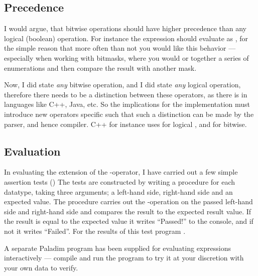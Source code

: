 \subsection{Precedence}
I would argue, that bitwise operations should have higher precedence than any
logical (boolean) operation. For instance the expression  should evaluate as , for the simple reason
that more often than not you would like this behavior --- especially when
working with bitmasks, where you would  or  together a
series of enumerations and then compare the result with another mask.

Now, I did state {\it any} bitwise operation, and I did state {\it any}
logical operation, therefore there needs to be a distinction between these
operators, as there is in languages like C++, Java, etc. So the implications
for the implementation must introduce new operators specific such that such a
distinction can be made by the parser, and hence compiler. C++ for instance
uses \code{\&\&} for logical , and \code{\&} for bitwise.

\subsection{Evaluation}
In evaluating the extension of the -operator, I have carried out a
few simple assertion tests ()
The tests are constructed by writing a procedure for each datatype, taking
three arguments; a left-hand side, right-hand side and an expected value. The
procedure carries out the -operation on the passed left-hand side
and right-hand side and compares the result to the expected result value. If
the result is equal to the expected value it writes ``Passed!'' to the
console, and if not it writes ``Failed''. For the results of this test program
.

A separate Paladim program has been supplied for evaluating expressions
interactively --- compile and run the  program to try it
at your discretion with your own data to verify.

